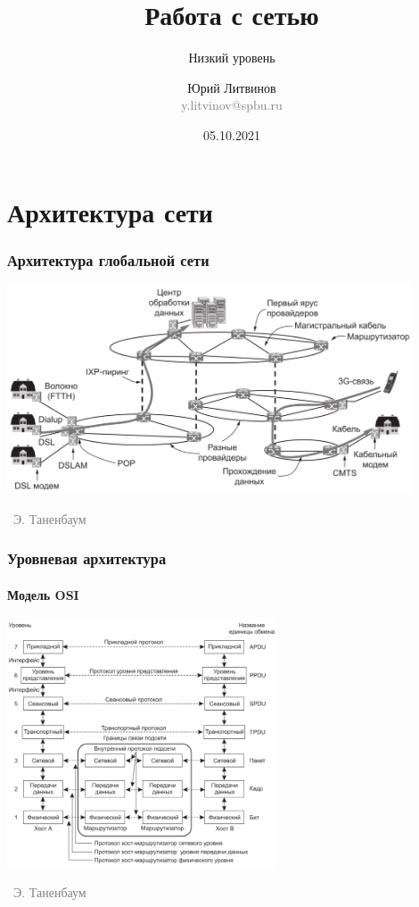 \documentclass[xetex,mathserif,serif]{beamer}
\title{Работа с сетью}
\subtitle{Низкий уровень}
\author[Юрий Литвинов]{Юрий Литвинов\\\small{\textcolor{gray}{y.litvinov@spbu.ru}}}
\date{05.10.2021}
\newcommand{\attribution}[1] {
\vspace{-5mm}\begin{flushright}\begin{scriptsize}\textcolor{gray}{\textcopyright\, #1}\end{scriptsize}\end{flushright}
}
\begin{document}
    \frame{\titlepage}

    \section{Архитектура сети}

    \begin{frame}
        \frametitle{Архитектура глобальной сети}
        \begin{center}
            \includegraphics[width=0.9\textwidth]{internetArchitecture.png}
            \attribution{Э. Таненбаум}
        \end{center}
    \end{frame}

    \begin{frame}
        \frametitle{Уровневая архитектура}
        \framesubtitle{Модель OSI}
        \begin{center}
            \includegraphics[width=0.6\textwidth]{osiStack.png}
            \attribution{Э. Таненбаум}
        \end{center}
    \end{frame}
\end{document}
